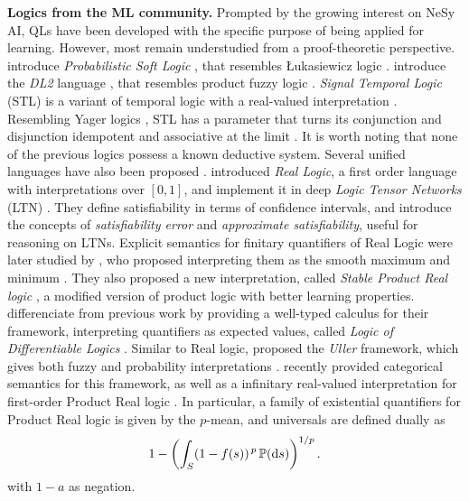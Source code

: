 \textbf{Logics from the ML community.} Prompted by the growing interest on NeSy AI, QLs have been developed with the specific purpose of being applied for learning. However, most remain understudied from a proof-theoretic perspective. \citeauthor{kimmig2012short} introduce \emph{Probabilistic Soft Logic} \citep{kimmig2012short}, that resembles  Łukasiewicz logic \cite{cintula2011handbook,prooffuzzy}. \citeauthor{fischer2019dl2} introduce the \emph{DL2} language \citep{fischer2019dl2}, that resembles product fuzzy logic \citep{cintula2011handbook, prooffuzzy}. \emph{Signal Temporal Logic} (STL) is a variant of temporal logic with a real-valued interpretation \citep{varnai2020robustness}. Resembling Yager logics \citep{cintula2011handbook}, STL has a parameter that turns its conjunction and disjunction idempotent and associative at the limit \citep{varnai2020robustness}. It is worth noting that none of the previous logics possess a known deductive system. Several unified languages have also been proposed \citep{badreddine2022logic, van2024uller, slusarz2023logic}. \citeauthor{serafini2016logic} introduced \emph{Real Logic}, a first order language with interpretations over $[0,1]$, and implement it in deep \emph{Logic Tensor Networks} (LTN) \cite{badreddine2022logic}.   
They define satisfiability in terms of confidence intervals, and introduce the concepts of \emph{satisfiability error} and \emph{approximate satisfiability}, useful for reasoning on LTNs. Explicit semantics for finitary quantifiers of Real Logic were later studied by \citeauthor{badreddine2022logic}, who proposed interpreting them as the smooth maximum and minimum \citep{badreddine2022logic}. They also proposed a new interpretation, called \emph{Stable Product Real logic} \citep{badreddine2022logic}, a modified version of product logic \citep{van2022analyzing} with better learning properties.  \citeauthor{slusarz2023logic} differenciate from previous work by providing a well-typed calculus for their framework, interpreting quantifiers as expected values, called \emph{Logic of Differentiable Logics}  \citep{slusarz2023logic}. Similar to Real logic, \citeauthor{van2024uller} proposed the \emph{Uller} framework, which gives both fuzzy and probability interpretations \citep{van2022analyzing}. \citeauthor{schellhorn2025muller} recently provided categorical semantics for this framework, as well as a infinitary real-valued interpretation for first-order Product Real logic \citep{schellhorn2025muller}. In particular, a family of existential quantifiers for Product Real logic is given by the $p$-mean, and universals are defined dually as
    \begin{equation}
        1 - \left(\int_{S} (1 - f(s))^{\,p}\, \mathbb{P}(\mathrm{d} s)\right)^{1/p}.
    \end{equation}
with $1 - a$ as negation.

